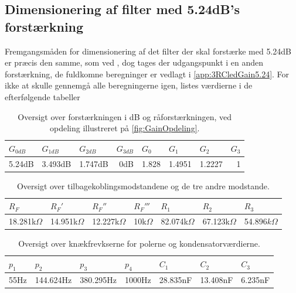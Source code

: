 \subsection{Dimensionering af filter med 5.24dB's forstærkning}
\label{DimensioneringAfFilter5.24}
%
Fremgangsmåden for dimensionering af det filter der skal forstærke med 5.24dB er præcis den samme, som ved , dog tages der udgangspunkt i en anden forstærkning, de fuldkomne beregninger er vedlagt i \autoref{app:3RCledGain5.24}. For ikke at skulle gennemgå alle beregningerne igen, listes værdierne i de efterfølgende tabeller
%
\begin{table}[H]
\centering
\begin{tabular}{|r|r|r|r|r|r|r|r|}
\hline
\multicolumn{1}{|l|}{$G_{0dB}$} & \multicolumn{1}{l|}{$G_{1dB}$} & \multicolumn{1}{l|}{$G_{2dB}$} & \multicolumn{1}{l|}{$G_{3dB}$} & \multicolumn{1}{l|}{$G_0$} & \multicolumn{1}{l|}{$G_1$} & \multicolumn{1}{l|}{$G_2$} & \multicolumn{1}{l|}{$G_3$} \\ \hline
5.24dB & 3.493dB & 1.747dB & 0dB & 1.828 & 1.4951 & 1.2227 & 1\\ \hline
\end{tabular}
\caption{Oversigt over forstærkningen i dB og råforstærkningen, ved opdeling illustreret på \autoref{fig:GainOpdeling}.}
\label{tab:DimensioneringAf5.24Gain}
\end{table}
\noindent
%
%
\begin{table}[H]
\centering
\begin{tabular}{|r|r|r|r|r|r|r|}
\hline
\multicolumn{1}{|l|}{$R_F$} & \multicolumn{1}{l|}{$R_F'$} & \multicolumn{1}{l|}{$R_F''$} & \multicolumn{1}{l|}{$R_F'''$} & \multicolumn{1}{l|}{$R_1$} & \multicolumn{1}{l|}{$R_2$} & \multicolumn{1}{l|}{$R_3$} \\ \hline
18.281k$\Omega$ & 14.951k$\Omega$ & 12.227k$\Omega$ & 10k$\Omega$ & 82.074k$\Omega$ & 67.123k$\Omega$ & 54.896$k\Omega$\\ \hline
\end{tabular}
\caption{Oversigt over tilbagekoblingsmodstandene og de tre andre modstande.}
\label{tab:DimensioneringAf5.24Modstand}
\end{table}
\noindent
%

%
\begin{table}[H]
\centering
\begin{tabular}{|r|r|r|r|r|r|r|}
\hline
\multicolumn{1}{|l|}{$p_1$} & \multicolumn{1}{l|}{$p_2$} & \multicolumn{1}{l|}{$p_3$} & \multicolumn{1}{l|}{$p_4$} & \multicolumn{1}{l|}{$C_1$} & \multicolumn{1}{l|}{$C_2$} & \multicolumn{1}{l|}{$C_3$} \\ \hline
55Hz & 144.624Hz & 380.295Hz & 1000Hz & 28.835nF & 13.408nF & 6.235nF \\ \hline
\end{tabular}
\caption{Oversigt over knækfrevkserne for polerne og kondensatorværdierne.}
\label{tab:DimensioneringAf5.24polC}
\end{table}
\noindent
%

